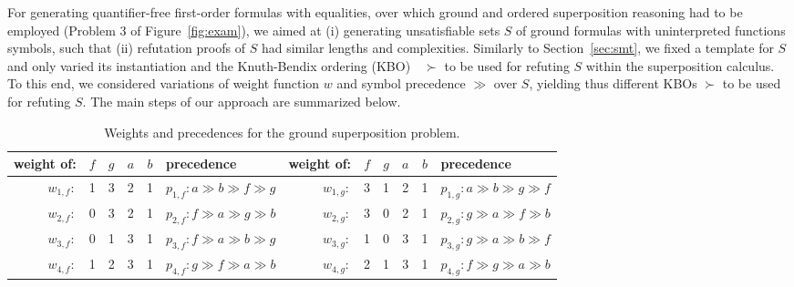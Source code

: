 For generating quantifier-free first-order formulas with equalities,
over which ground and ordered superposition reasoning had to be employed (Problem 3 of Figure~\ref{fig:exam}), we
aimed at (i)  generating  unsatisfiable sets $S$ of ground formulas with
uninterpreted functions symbols, such that (ii)  refutation proofs
of $S$ had similar lengths and complexities. Similarly to
Section~\ref{sec:smt}, we fixed a template for $S$  and only varied
its instantiation and
the Knuth-Bendix ordering (KBO)~\cite{Knuth1970}~$\succ$ to be used for refuting  $S$
within the superposition calculus. To this end, we considered
variations of weight function $w$ and symbol precedence $\gg$ over $S$,
yielding thus different KBOs $\succ$ to be used for refuting $S$.
The main steps of our approach are summarized below.\smallskip


\begin{table}[t]
\centering
\begin{tabular}{r@{\hskip 0.4em}c c c c@{\hskip 0.4em} |@{\hskip 0.4em} l@{\hskip 0.8em} ||@{\hskip 0.4em} r@{\hskip 0.4em} c c c c@{\hskip 0.4em} |@{\hskip 0.4em} l}
  weight of: & $f$ & $g$ & $a$ & $b$ & precedence
  & weight of: & $f$ & $g$ & $a$ & $b$ & precedence \\ \hline
  $w_{1,f}:$  & 1   & 3   & 2   & 1   & $p_{1,f}: a \gg b \gg f \gg g$ &
  $w_{1,g}:$  & 3   & 1   & 2   & 1   & $p_{1,g}: a \gg b \gg g \gg f$ \\ \hline
  $w_{2,f}:$  & 0   & 3   & 2   & 1   & $p_{2,f}: f \gg a \gg g \gg b$ &
  $w_{2,g}:$  & 3   & 0   & 2   & 1   & $p_{2,g}: g \gg a \gg f \gg b$ \\ \hline
  $w_{3,f}:$  & 0   & 1   & 3   & 1   & $p_{3,f}: f \gg a \gg b \gg g$ &
  $w_{3,g}:$  & 1   & 0   & 3   & 1   & $p_{3,g}: g \gg a \gg b \gg f$ \\ \hline
  $w_{4,f}:$  & 1   & 2   & 3   & 1   & $p_{4,f}: g \gg f \gg a \gg b$ &
  $w_{4,g}:$  & 2   & 1   & 3   & 1   & $p_{4,g}: f \gg g \gg a \gg b$ 
\end{tabular}
\vspace*{0.3em}
\caption{Weights and precedences for the ground superposition problem.}
\label{tab:ground-sup-wp}
\vspace*{-2em}
\end{table}

